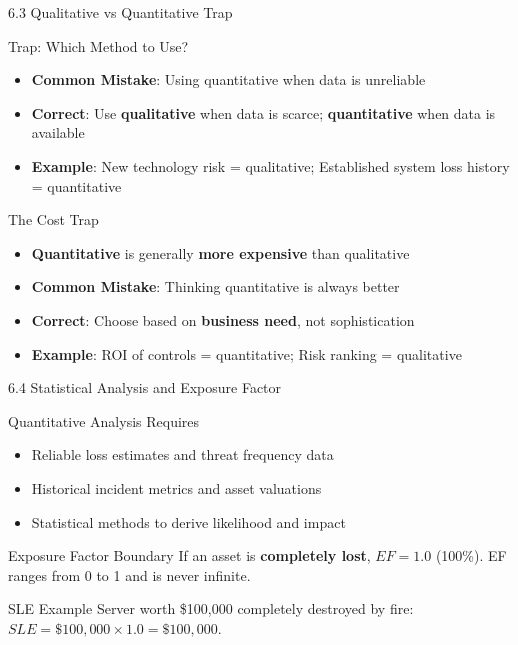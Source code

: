 \documentclass{beamer}
\begin{document}
	\begin{frame}{6.3 Qualitative vs Quantitative Trap}
		\begin{block}{Trap: Which Method to Use?}
			\begin{itemize}
				\item \textbf{Common Mistake}: Using quantitative when data is unreliable
				\item \textbf{Correct}: Use \textbf{qualitative} when data is scarce; \textbf{quantitative} when data is available
				\item \textbf{Example}: New technology risk = qualitative; Established system loss history = quantitative
			\end{itemize}
		\end{block}
		
		\begin{block}{The Cost Trap}
			\begin{itemize}
				\item \textbf{Quantitative} is generally \textbf{more expensive} than qualitative
				\item \textbf{Common Mistake}: Thinking quantitative is always better
				\item \textbf{Correct}: Choose based on \textbf{business need}, not sophistication
				\item \textbf{Example}: ROI of controls = quantitative; Risk ranking = qualitative
			\end{itemize}
		\end{block}
	\end{frame}
	
	\begin{frame}{6.4 Statistical Analysis and Exposure Factor}
		\begin{block}{Quantitative Analysis Requires}
			\begin{itemize}
				\item Reliable loss estimates and threat frequency data
				\item Historical incident metrics and asset valuations
				\item Statistical methods to derive likelihood and impact
			\end{itemize}
		\end{block}
		
		\begin{alertblock}{Exposure Factor Boundary}
			If an asset is \textbf{completely lost}, $EF = 1.0$ (100\%). EF ranges from 0 to 1 and is never infinite.
		\end{alertblock}
		
		\begin{exampleblock}{SLE Example}
			Server worth \$100,000 completely destroyed by fire: $SLE = \$100{,}000 \times 1.0 = \$100{,}000$.
		\end{exampleblock}
	\end{frame}
	
\end{document}
